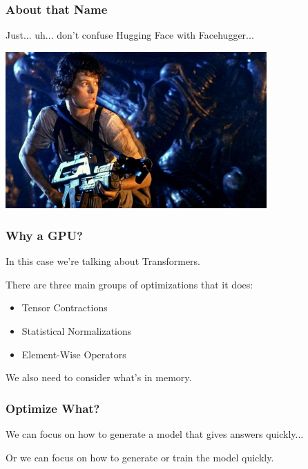 \begin{frame}
\frametitle{About that Name}

Just... uh... don't confuse Hugging Face with Facehugger...

\begin{center}
	\includegraphics[width=0.75\textwidth]{images/ripley.jpg}
\end{center}

\end{frame}

\begin{frame}
\frametitle{Why a GPU?}

In this case we're talking about Transformers.

There are three main groups of optimizations that it does:\\
\begin{itemize} 
	\item Tensor Contractions
	\item Statistical Normalizations
	\item Element-Wise Operators
\end{itemize}

We also need to consider what's in memory.

\end{frame}

\begin{frame}
\frametitle{Optimize What?}

We can focus on how to generate a model that gives answers quickly...

Or we can focus on how to generate or train the model quickly.

\end{frame}

